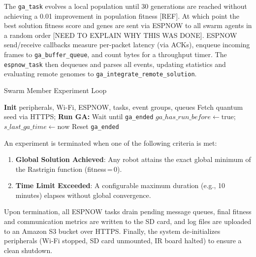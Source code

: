 \documentclass[conference]{IEEEtran}
\begin{document}
The \texttt{ga\_task} evolves a local population until 30 generations are reached without achieving a 0.01 improvement in population fitness [REF]. At which point the best solution fitness score and genes are sent via ESPNOW to all swarm agents in a random order [NEED TO EXPLAIN WHY THIS WAS DONE]. ESPNOW send/receive callbacks measure per-packet latency (via ACKs), enqueue incoming frames to \texttt{ga\_buffer\_queue}, and count bytes for a throughput timer. The \texttt{espnow\_task} then dequeues and parses all events, updating statistics and evaluating remote genomes to \texttt{ga\_integrate\_remote\_solution}. 

\begin{algorithm}[h]
\caption{Swarm Member Experiment Loop\label{alg:swarm-loop}}
\begin{algorithmic}[1]
  \State \textbf{Init} peripherals, Wi-Fi, ESPNOW, tasks, event groups, queues
  \State Fetch quantum seed via HTTPS; 
  \Loop
    \State \textbf{Run GA:} 
    \State Wait until \texttt{ga\_ended} 
    \State {}
    \State $ga\_has\_run\_before \gets \mathrm{true}$; $s\_last\_ga\_time \gets \mathrm{now}$
    \State {} 
      \State {}
    \EndFor
    \State {} 
    \State Reset \texttt{ga\_ended}
  \EndLoop
\end{algorithmic}
\end{algorithm}

An experiment is terminated when one of the following criteria is met:
\begin{enumerate}
  \item \textbf{Global Solution Achieved}: Any robot attains the exact global minimum of the Rastrigin function (fitness\,=\,0).
  \item \textbf{Time Limit Exceeded}: A configurable maximum duration (e.g., 10 minutes) elapses without global convergence.
\end{enumerate}
Upon termination, all ESPNOW tasks drain pending message queues, final fitness and communication metrics are written to the SD card, and log files are uploaded to an Amazon S3 bucket over HTTPS. Finally, the system de‐initializes peripherals (Wi‐Fi stopped, SD card unmounted, IR board halted) to ensure a clean shutdown.
\end{document}
